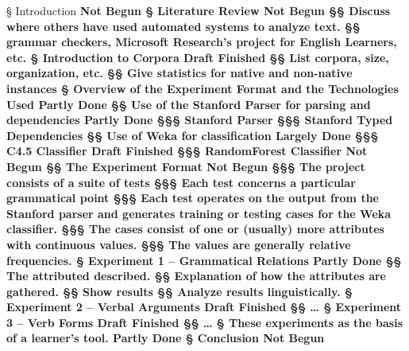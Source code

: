 \documentclass[12pt]{article}
\newcommand{\nb}[1]{\scriptsize \bfseries #1}
\begin{document}
\doublespacing
\begin{easylist}
§ Introduction \nb{Not Begun}
§ Literature Review \nb{Not Begun}
§§ Discuss where others have used automated systems to analyze text.
§§ grammar checkers, Microsoft Research's project for English Learners, etc.
§ Introduction to Corpora \nb{Draft Finished}
§§ List corpora, size, organization, etc.
§§ Give statistics for native and non-native instances
§ Overview of the Experiment Format and the Technologies Used \nb{Partly Done}
§§ Use of the Stanford Parser for parsing and dependencies \nb{Partly Done}
§§§ Stanford Parser
§§§ Stanford Typed Dependencies
§§ Use of Weka for classification \nb{Largely Done}
§§§ C4.5 Classifier \nb{Draft Finished}
§§§ RandomForest Classifier \nb{Not Begun}
§§ The Experiment Format \nb{Not Begun}
§§§ The project consists of a suite of tests
§§§ Each test concerns a particular grammatical point
§§§ Each test operates on the output from the Stanford parser and generates training or testing cases for the Weka classifier.
§§§ The cases consist of one or (usually) more attributes with continuous values.
§§§ The values are generally relative frequencies.
§ Experiment 1 -- Grammatical Relations \nb{Partly Done}
§§ The attributed described.
§§ Explanation of how the attributes are gathered.
§§ Show results
§§ Analyze results linguistically.
§ Experiment 2 -- Verbal Arguments \nb{Draft Finished}
§§ \ldots
§ Experiment 3 -- Verb Forms \nb{Draft Finished}
§§ \ldots
§ These experiments as the basis of a learner's tool. \nb{Partly Done}
§ Conclusion \nb{Not Begun}
\end{easylist}
\end{document}
